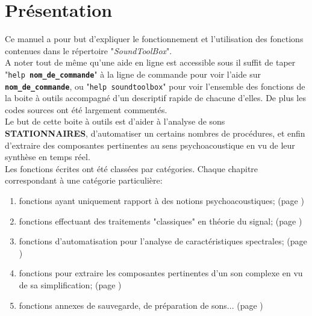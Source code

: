 \section*{Pr{\'e}sentation}

    Ce manuel a pour but d'expliquer le fonctionnement et l'utilisation
    des fonctions \matlab contenues dans le r{\'e}pertoire "{\it SoundToolBox}".\\

    A noter tout de m{\^e}me qu'une aide en ligne est accessible sous
    \matlabv il suffit de taper "{\tt help {\bf nom\_de\_commande}}" {\`a} la
    ligne de commande pour voir l'aide sur {\tt {\bf nom\_de\_commande}},
    ou "{\tt help soundtoolbox}" pour voir l'ensemble des fonctions de
    la boite {\`a} outils accompagn{\'e} d'un descriptif rapide de chacune
    d'elles. De plus les codes sources ont {\'e}t{\'e} largement comment{\'e}s.\\

    Le but de cette boite {\`a} outils est d'aider {\`a} l'analyse de sons
    {\color{red} \textbf{STATIONNAIRES}}, d'automatiser un certains
    nombres de proc{\'e}dures, et enfin d'extraire des composantes
    pertinentes au sens psychoacoustique en vu de leur synth{\`e}se en
    temps r{\'e}el.\\

    Les fonctions {\'e}crites ont {\'e}t{\'e} class{\'e}es par cat{\'e}gories. Chaque
    chapitre correspondant {\`a} une cat{\'e}gorie particuli{\`e}re:

    \begin{enumerate}
        \item fonctions ayant uniquement rapport {\`a} des notions
        psychoacoustiques; (page \pageref{secpsycho})

        \item fonctions effectuant des traitements "classiques" en
        th{\'e}orie du signal; (page \pageref{secclassiques})

        \item fonctions d'automatisation pour l'analyse de
        caract{\'e}ristiques spectrales; (page \pageref{secanalyses})

        \item fonctions pour extraire les composantes pertinentes
        d'un son complexe en vu de sa simplification; (page
        \pageref{secsimplification})

        \item fonctions annexes de sauvegarde, de pr{\'e}paration de
        sons... (page \pageref{secannexes})
    \end{enumerate}

